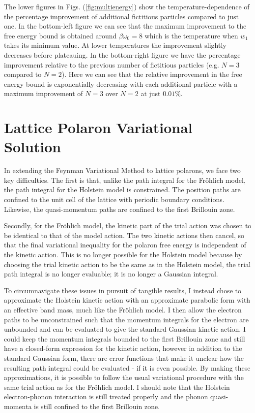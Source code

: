 The lower figures in Figs. (\ref{fig:multienergy}) show the temperature-dependence
of the percentage improvement of additional fictitious particles compared to just one. In the bottom-left figure we can see that the maximum improvement to the free energy bound is obtained around $\beta \omega_0 = 8$ which is the temperature when $w_1$ takes its minimum value. At lower temperatures the improvement slightly decreases before plateauing. In the bottom-right figure we have the percentage improvement relative to the previous number of fictitious particles (e.g. $N = 3$ compared to $N = 2$). Here we can see that the relative improvement in the free energy bound is exponentially decreasing with each additional particle with a maximum improvement of $N=3$ over $N=2$ at just $0.01$\%.

\section{Lattice Polaron Variational Solution}

In extending the Feynman Variational Method to lattice polarons, we face two key difficulties. The first is that, unlike the path integral for the Fr\"ohlich model, the path integral for the Holstein model is constrained. The position paths are confined to the unit cell of the lattice with periodic boundary conditions. Likewise, the quasi-momentum paths are confined to the first Brillouin zone. 
\newline

Secondly, for the Fr\"ohlich model, the kinetic part of the trial action was chosen to be identical to that of the model action. The two kinetic actions then cancel, so that the final variational inequality for the polaron free energy is independent of the kinetic action. This is no longer possible for the Holstein model because by choosing the trial kinetic action to be the same as in the Holstein model, the trial path integral is no longer evaluable; it is no longer a Gaussian integral.
\newline

To circumnavigate these issues in pursuit of tangible results, I instead chose to approximate the Holstein kinetic action with an approximate parabolic form with an effective band mass, much like the Fr\"ohlich model. I then allow the electron paths to be unconstrained such that the momentum integrals for the electron are unbounded and can be evaluated to give the standard Gaussian kinetic action. I could keep the momentum integrals bounded to the first Brillouin zone and still have a closed-form expression for the kinetic action, however in addition to the standard Gaussian form, there are error functions that make it unclear how the resulting path integral could be evaluated - if it is even possible. By making these approximations, it is possible to follow the usual variational procedure with the same trial action as for the Fr\"ohlich model. I should note that the Holstein electron-phonon interaction is still treated properly and the phonon quasi-momenta is still confined to the first Brillouin zone. 
\newline

